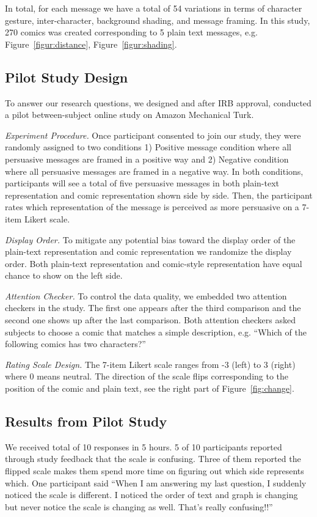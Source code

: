 In total, for each message we have a total of 54 variations in terms of character gesture, inter-character, background shading, and message framing. In this study, 270 comics was created corresponding to 5 plain text messages, e.g. Figure~\ref{figur:distance}, Figure~\ref{figur:shading}.

\subsection{Pilot Study Design}
To answer our research questions, we designed and after IRB approval, conducted a pilot between-subject online study on Amazon Mechanical Turk.

\textit{Experiment Procedure.} Once participant consented to join our study, they were randomly assigned to two conditions 1) Positive message condition where all persuasive messages are framed in a positive way and 2) Negative condition where all persuasive messages are framed in a negative way. In both conditions, participants will see a total of five persuasive messages in both plain-text representation and comic representation shown side by side. Then, the participant rates which representation of the message is perceived as more persuasive on a 7-item Likert scale.

\textit{Display Order.} To mitigate any potential bias toward the display order of the plain-text representation and comic representation we randomize the display order. Both plain-text representation and comic-style representation have equal chance to show on the left side.

\textit{Attention Checker.} To control the data quality, we embedded two attention checkers in the study. The first one appears after the third comparison and the second one shows up after the last comparison. Both attention checkers asked subjects to choose a comic that matches a simple description, e.g. ``Which of the following comics has two characters?''

\textit{Rating Scale Design.} The 7-item Likert scale ranges from -3 (left) to 3 (right) where 0 means neutral. The direction of the scale flips corresponding to the position of the comic and plain text, see the right part of Figure~\ref{fig:change}.


\subsection{Results from Pilot Study}
We received total of 10 responses in 5 hours. 5 of 10 participants reported through study feedback that the scale is confusing. Three of them reported the flipped scale makes them spend more time on figuring out which side represents which. One participant said ``When I am answering my last question, I suddenly noticed the scale is different. I noticed the order of text and graph is changing but never notice the scale is changing as well. That's really confusing!!''

